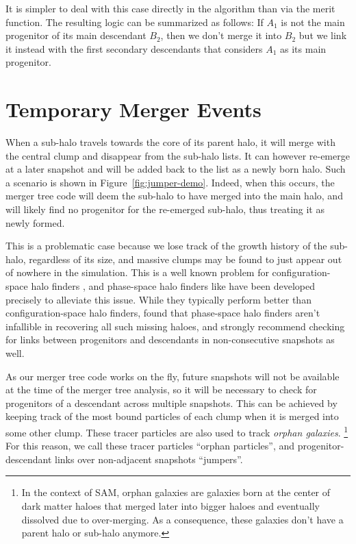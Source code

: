It is simpler to deal with this case directly in the algorithm
than via the merit function. The resulting logic can be summarized as
follows: If $A_1$ is not the main progenitor of its main descendant
$B_2$, then we don't merge it into $B_2$ but we link it instead with
the first secondary descendants that considers $A_1$ as its
main progenitor.





\section{Temporary Merger Events}
\label{sect:jumpers}



When a sub-halo travels towards the core of its parent halo, it will
merge with the central clump and disappear from the sub-halo lists.  It
can however re-emerge at a later snapshot and will be added back
to the list as a newly born halo. Such a scenario is shown in
Figure~\ref{fig:jumper-demo}.  Indeed, when this occurs, the merger
tree code will deem the sub-halo to have merged into the main halo, and
will likely find no progenitor for the re-emerged sub-halo, thus
treating it as newly formed.

This is a problematic case because we lose track of the growth history
of the sub-halo, regardless of its size, and massive clumps may be
found to just appear out of nowhere in the simulation.  This is a well
known problem for configuration-space halo finders
\citep{onionsSubhaloesGoingNotts2012}, and phase-space halo finders
like  \citep{behrooziRockstarPhaseSpaceTemporal2013}
have been developed precisely to alleviate this issue.  While they
typically perform better than configuration-space halo finders,
\cite{SUSSING_COMPARISON} found that phase-space halo finders aren't
infallible in recovering all such missing haloes, and strongly
recommend checking for links between progenitors and descendants in
non-consecutive snapshots as well.

As our merger tree code works on the fly, future snapshots will not be
available at the time of the merger tree analysis, so it will be
necessary to check for progenitors of a descendant across multiple
snapshots.  This can be achieved by keeping track of the most bound
particles of each clump when it is merged into some other clump.
These tracer particles are also used to track \emph{orphan galaxies}.
\footnote{In the context of SAM, orphan galaxies are galaxies born at
the center of dark matter haloes that merged later into bigger haloes
and eventually dissolved due to over-merging. As a consequence, these
galaxies don't have a parent halo or sub-halo anymore.}  For this
reason, we call these tracer particles ``orphan particles'', and
progenitor-descendant links over non-adjacent snapshots ``jumpers''.

